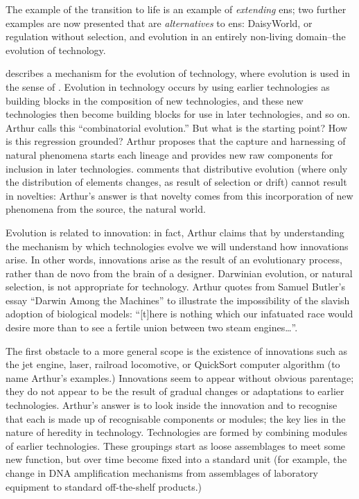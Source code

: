 The example of the transition to life is an example of \emph{extending} \gls{ens}; two further examples are now presented that are \emph{alternatives} to \gls{ens}: DaisyWorld, or regulation without selection, and evolution in an entirely non-living domain--the evolution of technology. 

\cite{Arthur2009} describes a mechanism for the evolution of technology, where evolution is used in the sense of . Evolution in technology occurs by using earlier technologies as building blocks in the composition of new technologies, and these new technologies then become building blocks for use in later technologies, and so on. Arthur calls this ``combinatorial evolution.'' But what is the starting point? How is this regression grounded? Arthur proposes that the capture and harnessing of natural phenomena starts each lineage and provides new raw components for inclusion in later technologies. \Cite{Bourrat2015} comments that distributive evolution (where only the distribution of elements changes, as result of selection or drift) cannot result in novelties: Arthur's answer is that novelty comes from this incorporation of new phenomena from the source, the natural world.

Evolution is related to innovation: in fact, Arthur claims that by understanding the mechanism by which technologies evolve we will understand how innovations arise. In other words, innovations arise as the result of an evolutionary process, rather than de novo from the brain of a designer. Darwinian evolution, or natural selection, is not appropriate for technology. Arthur quotes from Samuel Butler's essay ``Darwin Among the Machines'' to illustrate the impossibility of the slavish adoption of biological models: ``{[}t{]}here is nothing which our infatuated race would desire more than to see a fertile union between two steam engines\ldots{}''.

The first obstacle to a more general scope is the existence of innovations such as the jet engine, laser, railroad locomotive, or QuickSort computer algorithm (to name Arthur's examples.) Innovations seem to appear without obvious parentage; they do not appear to be the result of gradual changes or adaptations to earlier technologies. Arthur's answer is to look inside the innovation and to recognise that each is made up of recognisable components or modules; the key lies in the nature of heredity in technology. Technologies are formed by combining modules of earlier technologies. These groupings start as loose assemblages to meet some new function, but over time become fixed into a standard unit (for example, the change in DNA amplification mechanisms from assemblages of laboratory equipment to standard off-the-shelf products.)

